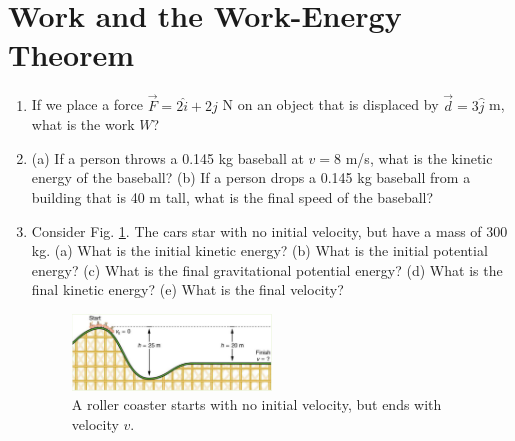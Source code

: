 \documentclass[10pt]{article}
\begin{document}
\section{Work and the Work-Energy Theorem}
\begin{enumerate}
\item If we place a force $\vec{F} = 2\hat{i} + 2\hat{j}$ N on an object that is displaced by $\vec{d} = 3\hat{j}$ m, what is the work $W$? \\ \vspace{0.75cm}
\item (a) If a person throws a 0.145 kg baseball at $v=8$ m/s, what is the kinetic energy of the baseball?  (b) If a person drops a 0.145 kg baseball from a building that is 40 m tall, what is the final speed of the baseball? \\ \vspace{1cm}
\item Consider Fig. \ref{fig:coaster}.  The cars star with no initial velocity, but have a mass of 300 kg.  (a) What is the initial kinetic energy? (b) What is the initial potential energy? (c) What is the final gravitational potential energy? (d) What is the final kinetic energy? (e) What is the final velocity?
\begin{figure}[ht]
\centering
\includegraphics[width=0.5\textwidth]{figures/coaster.png}
\caption{\label{fig:coaster} A roller coaster starts with no initial velocity, but ends with velocity $v$.}
\end{figure}
\end{enumerate}
\end{document}
